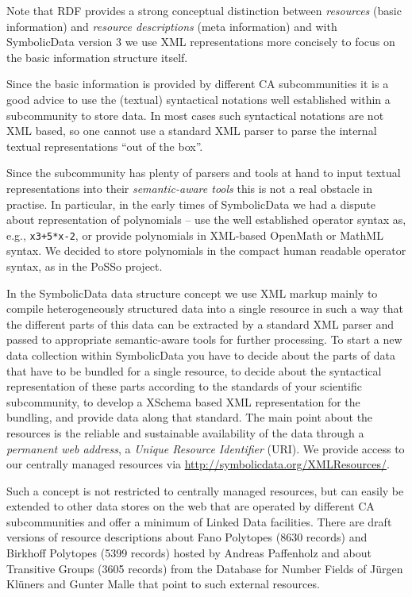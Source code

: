 \documentclass{llncs}
\newcommand{\SD}{{\sc Symbolic\-Data}}
\def\pw{{\char94}}
\begin{document}
Note that RDF provides a strong conceptual distinction between
\emph{resources} (basic information) and \emph{resource descriptions} (meta
information) and with {\SD} version 3 we use XML representations more
concisely to focus on the basic information structure itself.

Since the basic information is provided by different CA subcommunities it is a
good advice to use the (textual) syntactical notations well established within
a subcommunity to store data. In most cases such syntactical notations are not
XML based, so one cannot use a standard XML parser to parse the internal
textual representations ``out of the box''.

Since the subcommunity has plenty of parsers and tools at hand to input
textual representations into their \emph{semantic-aware tools} this is not a
real obstacle in practise. In particular, in the early times of {\SD} we had a
dispute about representation of polynomials -- use the well established
operator syntax as, e.g., \texttt{x{\pw}3+5*x-2}, or provide polynomials in
XML-based OpenMath or MathML syntax. We decided to store polynomials in the
compact human readable operator syntax, as in the PoSSo project.

In the {\SD} data structure concept we use XML markup mainly to compile
heterogeneously structured data into a single resource in such a way that the
different parts of this data can be extracted by a standard XML parser and
passed to appropriate semantic-aware tools for further processing.  To start a
new data collection within {\SD} you have to decide about the parts of data
that have to be bundled for a single resource, to decide about the syntactical
representation of these parts according to the standards of your scientific
subcommunity, to develop a XSchema based XML representation for the bundling,
and provide data along that standard.  The main point about the resources is
the reliable and sustainable availability of the data through a
\emph{permanent web address}, a \emph{Unique Resource Identifier} (URI).  We
provide access to our centrally managed resources via
\url{http://symbolicdata.org/XMLResources/}.

Such a concept is not restricted to centrally managed resources, but can
easily be extended to other data stores on the web that are operated by
diffe\-rent CA subcommunities and offer a minimum of Linked Data facilities.
There are draft versions of resource descriptions about Fano Polytopes (8630
records) and Birkhoff Polytopes (5399 records) hosted by Andreas Paffenholz
and about Transitive Groups (3605 records) from the Database for Number Fields
of J\"urgen Kl\"uners and Gunter Malle that point to such external resources.  
\end{document}
